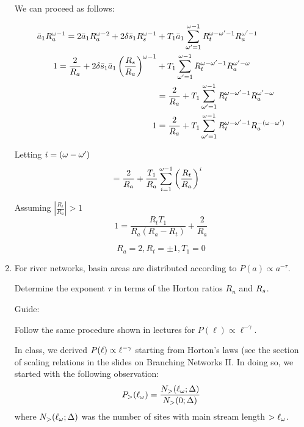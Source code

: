 \begin{enumerate}
   We can proceed as follows:
   
   \begin{align}
   \bar{a}_{1}R^{\omega-1}_{a}
   =
   2\bar{a}_{1}R^{\omega-2}_{a}
   +
   2\delta \bar{s}_1 R_{s}^{\omega-1}
   &+
   T_1 \bar{a}_{1}
   \sum_{\omega'=1}^{\omega-1}
   R_{t}^{\omega-\omega'-1}
   R_{a}^{\omega'-1}\\
   1
   =
   \frac{2} {R_a}
   +
   {2\delta \bar{s}_1} {\bar{a}_1}
   \left(
   \frac{R_s}{R_a}
   \right)^{\omega-1}
   &+
   T_1
   \sum_{\omega'=1}^{\omega-1}
   R_{t}^{\omega-\omega'-1}
   R_{a}^{\omega'-\omega}\\
   &= 
   \frac{2} {R_a}
   +
   T_1
   \sum_{\omega'=1}^{\omega-1}
   R_{t}^{\omega-\omega'-1}
   R_{a}^{\omega'-\omega}\\
   1 &= 
   \frac{2} {R_a}
   +
   T_1
   \sum_{\omega'=1}^{\omega-1}
   R_{t}^{\omega-\omega'-1}
   R_{a}^{-(\omega-\omega')}
   \end{align}

Letting $i = (\omega-\omega')$\\

   \begin{align}
   &= 
   \frac{2} {R_a}
   +
   \frac{T_1}{R_a}
   \sum_{i=1}^{\omega-1}
   \left(
        \frac{R_{t}}{R_a}
   \right)^{i}
   \end{align}

Assuming  $|\frac{R_t}{R_a}| > 1$\\
$$
   1 = \frac{R_t T_1}{R_a (R_a - R_t)} + \frac{2}{R_a}
$$

$$
   R_a = 2, R_t = \pm 1, T_1 = 0
$$
   
   \solutionend

\item 

  For river networks, basin areas are distributed
  according to $P(a) \propto a^{-\tau}$.

  Determine the exponent $\tau$ in terms of the Horton ratios
  $R_n$ and $R_s$.

  Guide:

  Follow the same procedure shown in lectures for
  $P(\ell) \propto \ell^{-\gamma}$.

    In class, we derived $P(\ell) \propto \ell^{-\gamma}$ starting
    from Horton's laws (see the section of scaling relations
    in the slides on Branching Networks II.
    In doing so, we started with
    the following observation:
    $$
    P_{>} (\ell_{\omega})
    =
    \frac{N_{>} (\ell_{\omega}; \Delta)}{
      N_{>} (0; \Delta)}
    $$
    where $N_{>} (\ell_{\omega}; \Delta)$ was the number of sites
    with main stream length $> \ell_{\omega}$.


\end{enumerate}
